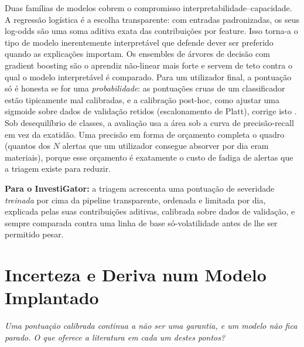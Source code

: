 Duas famílias de modelos cobrem o compromisso interpretabilidade--capacidade. A regressão logística é a
escolha transparente: com entradas padronizadas, os seus log-odds são uma soma aditiva exata das
contribuições por feature. Isso torna-a o tipo de modelo inerentemente interpretável que
\textcite{rudin2019stop} defende dever ser preferido quando as explicações importam. Os ensembles de
árvores de decisão com gradient boosting \autocite{friedman2001gbm} são o aprendiz não-linear mais forte e
servem de teto contra o qual o modelo interpretável é comparado. Para um utilizador final, a pontuação só
é honesta se for uma \emph{probabilidade}: as pontuações cruas de um classificador estão tipicamente mal
calibradas, e a calibração post-hoc, como ajustar uma sigmoide sobre dados de validação retidos
(escalonamento de Platt), corrige isto \autocite{niculescu2005calibration}. Sob desequilíbrio de classes,
a avaliação usa a área sob a curva de precisão-recall em vez da exatidão. Uma precisão em forma de
orçamento completa o quadro (quantos dos $N$ alertas que um utilizador consegue absorver por dia eram
materiais), porque esse orçamento é exatamente o custo de fadiga de alertas que a triagem existe para
reduzir.

\textbf{Para o InvestiGator:} a triagem acrescenta uma pontuação de severidade \emph{treinada} por cima da
pipeline transparente, ordenada e limitada por dia, explicada pelas suas contribuições aditivas, calibrada
sobre dados de validação, e sempre comparada contra uma linha de base só-volatilidade antes de lhe ser
permitido pesar.

\section{Incerteza e Deriva num Modelo Implantado}
\label{sec:sota_uncertainty}

\emph{Uma pontuação calibrada continua a não ser uma garantia, e um modelo não fica parado. O que
oferece a literatura em cada um destes pontos?}


